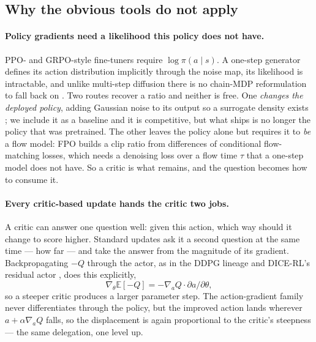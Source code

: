 \subsection{Why the obvious tools do not apply}
\label{sec:failure-modes}

\paragraph{Policy gradients need a likelihood this policy does not have.}
PPO- and GRPO-style fine-tuners \citep{simplevlarl} require
$\log\pi(a\mid s)$. A one-step generator defines its action distribution
implicitly through the noise map, its likelihood is intractable, and unlike
multi-step diffusion there is no chain-MDP reformulation to fall back on
\citep{ren2024dppo,park2025fql}. Two routes recover a ratio and neither is
free. One \emph{changes the deployed policy}, adding Gaussian noise to its
output so a surrogate density exists \citep{reinflow2025}; we include it as a
baseline and it is competitive, but what ships is no longer the policy that
was pretrained. The other leaves the policy alone but requires it to \emph{be}
a flow model: FPO \citep{mcallister2025flowmatchingpolicygradients} builds a
clip ratio from differences of conditional flow-matching losses, which needs a
denoising loss over a flow time $\tau$ that a one-step model does not have. So
a critic is what remains, and the question becomes how to consume it.

\paragraph{Every critic-based update hands the critic two jobs.} A critic can
answer one question well: given this action, which way should it change to
score higher. Standard updates ask it a second question at the same time ---
how far --- and take the answer from the magnitude of its gradient.
Backpropagating $-Q$ through the actor, as in the DDPG lineage and DICE-RL's
residual actor \citep{dicerl2026}, does this explicitly,
\begin{equation}
  \nabla_\theta \mathbb{E}[-Q] = -\nabla_a Q \cdot \partial a/\partial\theta ,
  \label{eq:backprop-coupling}
\end{equation}
so a steeper critic produces a larger parameter step. The action-gradient
family \citep{dipo2024,psenka2024qsm} never differentiates through the policy,
but the improved action lands wherever $a + \alpha\nabla_a Q$ falls, so the
displacement is again proportional to the critic's steepness --- the same
delegation, one level up.

